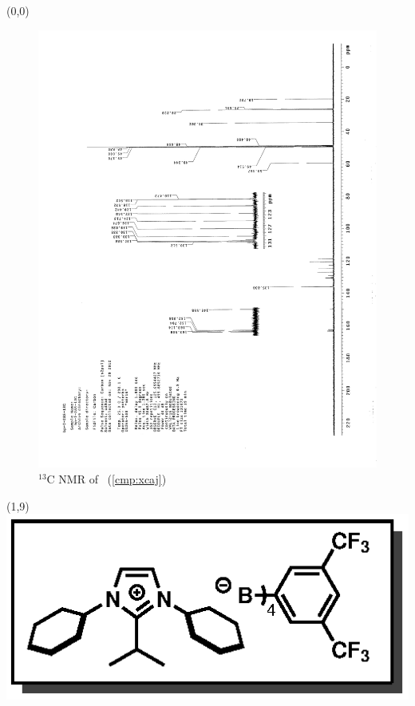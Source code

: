 \clearpage
\begin{textblock}{20}(0,0)
\begin{figure}[htb]
\caption{$^{13}$C NMR of  \CMPxcaj\ (\ref{cmp:xcaj})}
\includegraphics[scale=0.75, trim = 0mm 0mm 0mm 5mm,
clip]{chp_alkylation/images/nmr/xcajC}
\vspace{-100pt}
\end{figure}
\end{textblock}
\begin{textblock}{1}(1,9)
\includegraphics[scale=0.8, angle=90]{chp_alkylation/images/xcaj}
\end{textblock}
\clearpage

